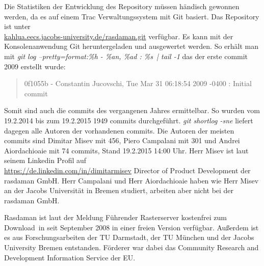 Die Statistiken der Entwicklung des Repository müssen händisch gewonnen werden, da es auf einem Trac Verwaltungssystem mit Git basiert.
Das Repository ist unter\\\url{kahlua.eecs.jacobs-university.de/rasdaman.git} verfügbar.
Es kann mit der Konsolenanwendung Git heruntergeladen und ausgewertet werden.
So erhält man mit \textit{git log --pretty=format:\grqq \%h - \%an, \%ad : \%s\grqq\ | tail -1} das der erste commit 2009 erstellt wurde:
\begin{quote}
0f1055b - Constantin Jucovschi, Tue Mar 31 06:18:54 2009 -0400 : Initial commit
\end{quote}
Somit sind auch die commits des vergangenen Jahres ermittelbar.
So wurden vom 19.2.2014 bis zum 19.2.2015 1949 commits durchgeführt.
\textit{git shortlog -sne} liefert dagegen alle Autoren der vorhandenen commits.
Die Autoren der meisten commits sind Dimitar Misev mit 456, Piero Campalani mit 301 und Andrei Aiordachioaie mit 74 commits, Stand 19.2.2015 14:00 Uhr.
Herr Misev ist laut seinem Linkedin Profil auf\\\url{https://de.linkedin.com/in/dimitarmisev} Director of Product Development der \mbox{rasdaman} GmbH.
Herr Campalani und Herr Aiordachioaie haben wie Herr Misev an der Jacobs Universität in Bremen studiert, arbeiten aber nicht bei der \mbox{rasdaman} GmbH.

Rasdaman ist laut der Meldung \glqq Führender Rasterserver kostenfrei zum Download\grqq\ in \cite{website:rasdaman-newsarchive} seit September 2008 in einer freien Version verfügbar.
Außerdem ist es aus Forschungsarbeiten der TU Darmstadt, der TU München und der Jacobs University Bremen entstanden.
Förderer war dabei das Community Research and Development Information Service der EU. \cite{website:rasdaman-cordis}
